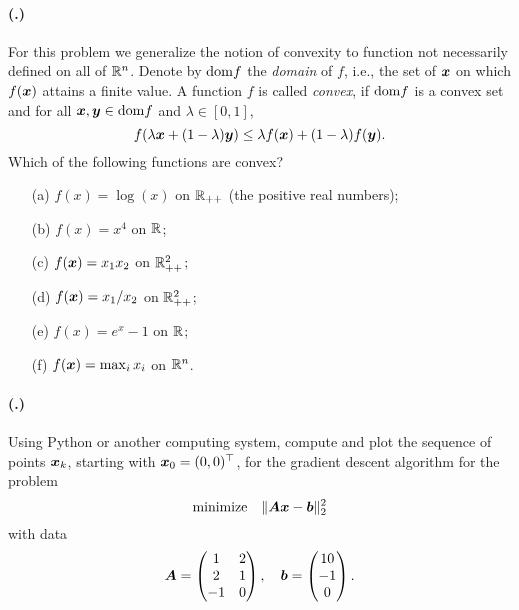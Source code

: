 \documentclass{article}
\newcounter{problemSheetNumber}
\newcounter{problems}
\renewcommand{\problem}{\paragraph{(\theproblemSheetNumber.\theproblems)}\addtocounter{problems}{1}}
\begin{document}
\problem For this problem we generalize the notion of convexity to function not necessarily defined on all of $\mathbb{R}^n$. Denote by $\mathrm{dom} f$ the {\em domain} of $f$, i.e., the set of $\bm{x}$ on which $f(\bm{x})$ attains a finite value. A function $f$ is called {\em convex}, if $\mathrm{dom} f$ is a convex set and for all $\bm{x},\bm{y}\in \mathrm{dom} f$ and $\lambda\in [0,1]$,
\begin{equation*}
 f(\lambda \bm{x}+(1-\lambda)\bm{y})\leq \lambda f(\bm{x})+(1-\lambda)f(\bm{y}).
\end{equation*}
Which of the following functions are convex?
\begin{itemize}
 \item[(a)] $f(x) = \log(x)$ on $\mathbb{R}_{++}$ (the positive real numbers);
 \item[(b)] $f(x) = x^4$ on $\mathbb{R}$;
 \item[(c)] $f(\bm{x}) = x_1x_2$ on $\mathbb{R}^2_{++}$;
 \item[(d)] $f(\bm{x}) = x_1/x_2$ on $\mathbb{R}^2_{++}$;
 \item[(e)] $f(x)=e^x-1$ on $\mathbb{R}$;
 \item[(f)] $f(\bm{x}) = \max_i x_i$ on $\mathbb{R}^n$.
\end{itemize}

\problem Using Python or another computing system, compute and plot the sequence of points $\bm{x}_k$, starting with $\bm{x}_0=(0,0)^{\top}$, for the gradient descent algorithm for the problem
\begin{equation*}
 \text{minimize}\quad \Vert {\bm{A}\bm{x}-\bm{b}}\Vert_2^2
\end{equation*}
with data
 \begin{equation*}
  \bm{A} = \begin{pmatrix}
             1 & 2\\
             2 & 1\\
             -1 & 0
            \end{pmatrix},
\quad \bm{b} = \begin{pmatrix}
                 10\\-1\\0
                \end{pmatrix}.
 \end{equation*}
\end{document}
